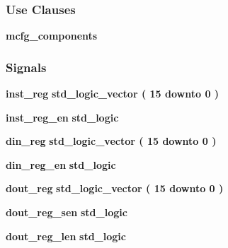 \subsubsection*{Use Clauses}
 \begin{DoxyCompactItemize}
\item 
{\bf mcfg\+\_\+components}   
\end{DoxyCompactItemize}
\subsubsection*{Signals}
 \begin{DoxyCompactItemize}
\item 
{\bf inst\+\_\+reg} {\bfseries \textcolor{comment}{std\+\_\+logic\+\_\+vector}\textcolor{vhdlchar}{ }\textcolor{vhdlchar}{(}\textcolor{vhdlchar}{ }\textcolor{vhdlchar}{ } \textcolor{vhdldigit}{15} \textcolor{vhdlchar}{ }\textcolor{keywordflow}{downto}\textcolor{vhdlchar}{ }\textcolor{vhdlchar}{ } \textcolor{vhdldigit}{0} \textcolor{vhdlchar}{ }\textcolor{vhdlchar}{)}\textcolor{vhdlchar}{ }} 
\item 
{\bf inst\+\_\+reg\+\_\+en} {\bfseries \textcolor{comment}{std\+\_\+logic}\textcolor{vhdlchar}{ }} 
\item 
{\bf din\+\_\+reg} {\bfseries \textcolor{comment}{std\+\_\+logic\+\_\+vector}\textcolor{vhdlchar}{ }\textcolor{vhdlchar}{(}\textcolor{vhdlchar}{ }\textcolor{vhdlchar}{ } \textcolor{vhdldigit}{15} \textcolor{vhdlchar}{ }\textcolor{keywordflow}{downto}\textcolor{vhdlchar}{ }\textcolor{vhdlchar}{ } \textcolor{vhdldigit}{0} \textcolor{vhdlchar}{ }\textcolor{vhdlchar}{)}\textcolor{vhdlchar}{ }} 
\item 
{\bf din\+\_\+reg\+\_\+en} {\bfseries \textcolor{comment}{std\+\_\+logic}\textcolor{vhdlchar}{ }} 
\item 
{\bf dout\+\_\+reg} {\bfseries \textcolor{comment}{std\+\_\+logic\+\_\+vector}\textcolor{vhdlchar}{ }\textcolor{vhdlchar}{(}\textcolor{vhdlchar}{ }\textcolor{vhdlchar}{ } \textcolor{vhdldigit}{15} \textcolor{vhdlchar}{ }\textcolor{keywordflow}{downto}\textcolor{vhdlchar}{ }\textcolor{vhdlchar}{ } \textcolor{vhdldigit}{0} \textcolor{vhdlchar}{ }\textcolor{vhdlchar}{)}\textcolor{vhdlchar}{ }} 
\item 
{\bf dout\+\_\+reg\+\_\+sen} {\bfseries \textcolor{comment}{std\+\_\+logic}\textcolor{vhdlchar}{ }} 
\item 
{\bf dout\+\_\+reg\+\_\+len} {\bfseries \textcolor{comment}{std\+\_\+logic}\textcolor{vhdlchar}{ }} 
\item 

\end{DoxyCompactItemize}
